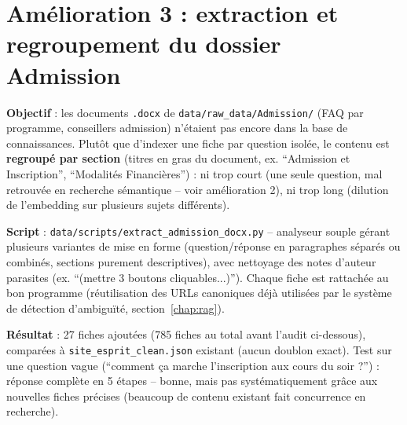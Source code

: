 \documentclass[11pt,a4paper]{report}
\begin{document}
\section{Amélioration 3 : extraction et regroupement du dossier Admission}
\textbf{Objectif} : les documents \texttt{.docx} de \texttt{data/raw\_data/Admission/}
(FAQ par programme, conseillers admission) n'étaient pas encore dans la base de
connaissances. Plutôt que d'indexer une fiche par question isolée, le contenu est
\textbf{regroupé par section} (titres en gras du document, ex. ``Admission et
Inscription'', ``Modalités Financières'') : ni trop court (une seule question, mal
retrouvée en recherche sémantique -- voir amélioration 2), ni trop long (dilution de
l'embedding sur plusieurs sujets différents).

\textbf{Script} : \texttt{data/scripts/extract\_admission\_docx.py} -- analyseur souple
gérant plusieurs variantes de mise en forme (question/réponse en paragraphes séparés ou
combinés, sections purement descriptives), avec nettoyage des notes d'auteur parasites
(ex. ``(mettre 3 boutons cliquables...)''). Chaque fiche est rattachée au bon programme
(réutilisation des URLs canoniques déjà utilisées par le système de détection
d'ambiguïté, section~\ref{chap:rag}).

\textbf{Résultat} : 27 fiches ajoutées (785 fiches au total avant l'audit ci-dessous),
comparées à \texttt{site\_esprit\_clean.json} existant (aucun doublon exact). Test sur
une question vague (``comment ça marche l'inscription aux cours du soir ?'') : réponse
complète en 5 étapes -- bonne, mais pas systématiquement grâce aux nouvelles fiches
précises (beaucoup de contenu existant fait concurrence en recherche).
\end{document}

